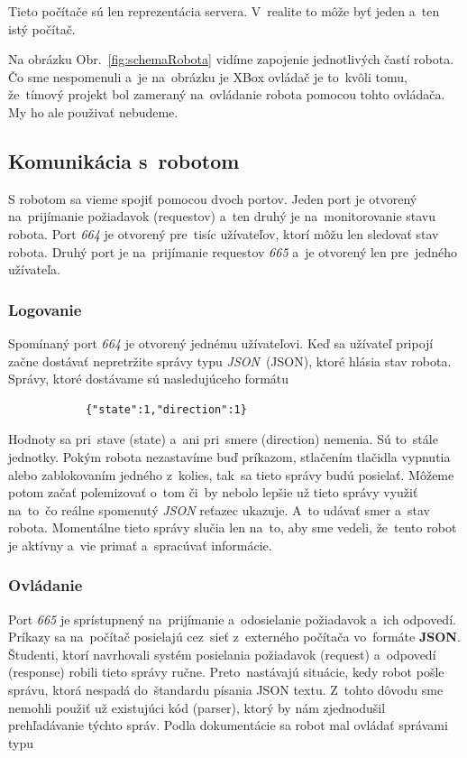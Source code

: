 \noindent Tieto počítače sú len reprezentácia servera. V~realite to môže byť jeden a~ten istý počítač.

\noindent Na obrázku Obr.~\ref{fig:schemaRobota} vidíme zapojenie jednotlivých častí robota. Čo sme nespomenuli a~je na~obrázku je XBox ovládač
je to~kvôli tomu, že~tímový projekt bol zameraný na~ovládanie robota pomocou tohto ovládača. My ho ale použivať nebudeme.

\subsection{Komunikácia s~robotom}

S robotom sa vieme spojiť pomocou dvoch portov. Jeden port je otvorený na~prijímanie požiadavok (requestov) a~ten druhý je na~monitorovanie
stavu robota. Port \textit{664} je otvorený pre~tisíc užívateľov, ktorí môžu len sledovať stav robota. Druhý port je na~prijímanie requestov
\textit{665} a~je otvorený len pre~jedného užívateľa.

\subsubsection{Logovanie}
\label{sec:logovanie}

	Spomínaný port \textit{664} je otvorený jednému užívateľovi. Keď sa užívateľ pripojí začne dostávať nepretržite správy typu
	\textit{JSON}~(\acrlong{JSON}), ktoré hlásia stav robota. Správy, ktoré dostávame sú nasledujúceho formátu

	\begin{lstlisting}
			{"state":1,"direction":1}
	\end{lstlisting}

	Hodnoty sa pri~stave (state) a~ani pri~smere (direction) nemenia. Sú to~stále jednotky. Pokým robota nezastavíme buď príkazom, stlačením
	tlačidla vypnutia alebo zablokovaním jedného z~kolies, tak~sa tieto správy budú posielať. Môžeme potom začať polemizovať o~tom či~by nebolo
	lepšie už tieto správy využiť na~to~čo reálne spomenutý \textit{JSON} reťazec ukazuje. A~to udávať smer a~stav robota. Momentálne tieto správy
	slučia len na~to, aby sme vedeli, že~tento robot je aktívny a~vie primať a~spracúvať informácie.

\subsubsection{Ovládanie}
\label{sec:ovladanie}

	Port \textit{665} je sprístupnený na~prijímanie a~odosielanie požiadavok a~ich odpovedí. Príkazy sa na~počítač posielajú cez~sieť z~externého
	počítača vo~formáte \textbf{JSON}. Študenti, ktorí navrhovali systém posielania požiadavok (request) a~odpovedí (response) robili tieto správy
	ručne. Preto~nastávajú situácie, kedy robot pošle správu, ktorá nespadá do~štandardu písania JSON textu. Z~tohto dôvodu sme nemohli použiť už
	existujúci kód (parser), ktorý by nám zjednodušil prehľadávanie týchto správ. Podla dokumentácie sa robot mal ovládať správami typu~\cite{BMdoc}

